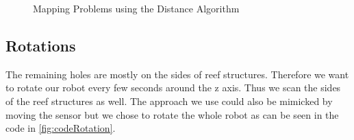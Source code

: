 \documentclass[twoside, 12pt]{article}
\begin{document}
\begin{figure}
\vspace{-28pt}
  \begin{center}
  \end{center}
\vspace{-20pt}
  \caption{Mapping Problems using the Distance Algorithm}
  \label{fig:secondMappingProblems}
\vspace{20pt}
\end{figure}

\begin{figure}
\vspace{-50pt}
\end{figure}

\subsection{Rotations}
The remaining holes are mostly on the sides of reef structures. Therefore we want to rotate our robot every few seconds around the z axis. Thus we scan the sides of the reef structures as well. The approach we use could also be mimicked by moving the sensor but we chose to rotate the whole robot as can be seen in the code in \autoref{fig:codeRotation}.\\
\end{document}
